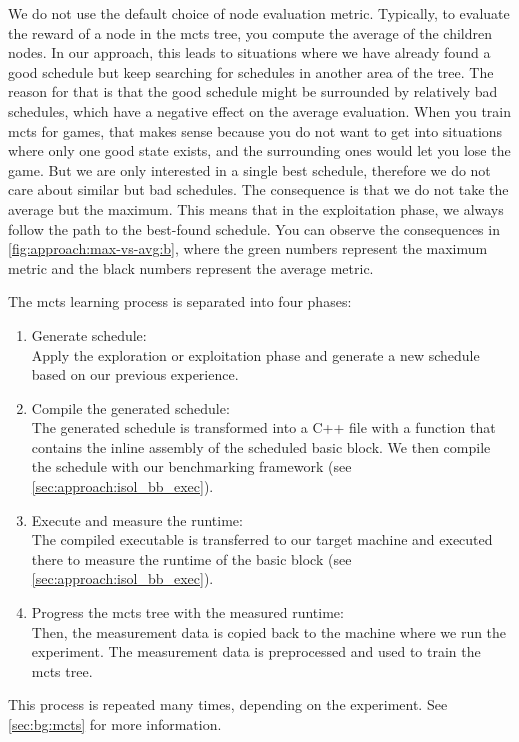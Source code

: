 We do not use the default choice of node evaluation metric.
Typically, to evaluate the reward of a node in the \ac{mcts} tree, you compute the average of the children nodes.
In our approach, this leads to situations where we have already found a good schedule but keep searching for schedules in another area of the tree.
The reason for that is that the good schedule might be surrounded by relatively bad schedules, which have a negative effect on the average evaluation.
When you train \ac{mcts} for games, that makes sense because you do not want to get into situations where only one good state exists, and the surrounding ones would let you lose the game.
But we are only interested in a single best schedule, therefore we do not care about similar but bad schedules.
The consequence is that we do not take the average but the maximum.
This means that in the exploitation phase, we always follow the path to the best-found schedule.
You can observe the consequences in \cref{fig:approach:max-vs-avg:b}, where the green numbers represent the maximum metric and the black numbers represent the average metric.

The \ac{mcts} learning process is separated into four phases:
\begin{enumerate}
    \item Generate schedule: \\
    Apply the exploration or exploitation phase and generate a new schedule based on our previous experience.
    \item Compile the generated schedule: \\
    The generated schedule is transformed into a C++ file with a function that contains the inline assembly of the scheduled basic block.
    We then compile the schedule with our benchmarking framework (see \cref{sec:approach:isol_bb_exec}).
    \item Execute and measure the runtime: \\
    The compiled executable is transferred to our target machine and executed there to measure the runtime of the basic block (see \cref{sec:approach:isol_bb_exec}).
    \item Progress the \ac{mcts} tree with the measured runtime: \\
    Then, the measurement data is copied back to the machine where we run the experiment.
    The measurement data is preprocessed and used to train the \ac{mcts} tree.
\end{enumerate}
This process is repeated many times, depending on the experiment.
See \cref{sec:bg:mcts} for more information.


